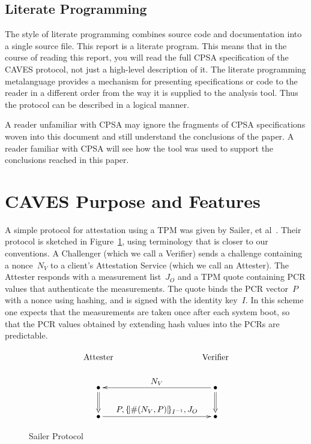 \documentclass[titlepage,12pt]{article}
\theoremstyle{definition}
\newcommand{\enc}[2]{\{\!|#1|\!\}_{#2}}
\begin{document}
\subsection{Literate Programming}

The style of literate programming combines source code and
documentation into a single source file.  This report is a literate
program. This means that in the course of reading this report, you
will read the full CPSA specification of the CAVES protocol, not just a
high-level description of it.  The literate programming metalanguage
provides a mechanism for presenting specifications or code to the
reader in a different order from the way it is supplied to the
analysis tool.  Thus the protocol can be described in a logical
manner.

A reader unfamiliar with CPSA may ignore the fragments of CPSA
specifications woven into this document and still understand the
conclusions of the paper.  A reader familiar with CPSA will see how
the tool was used to support the conclusions reached in this paper.

\section{CAVES Purpose and Features}

A simple protocol for attestation using a TPM was given by Sailer, et
al~\cite{Sailer04}.  Their protocol is sketched in
Figure~\ref{fig:sailer}, using terminology that is closer to our
conventions. A Challenger (which we call a Verifier) sends a challenge
containing a nonce~$N_V$ to a client's Attestation Service (which we
call an Attester). The Attester responds with a measurement list~$J_O$
and a TPM quote containing PCR values that authenticate the
measurements.  The quote binds the PCR vector~$P$ with a nonce using
hashing, and is signed with the identity key~$I$.  In this scheme one
expects that the measurements are taken once after each system boot,
so that the PCR values obtained by extending hash values into the PCRs
are predictable.

\begin{figure}
$$\xymatrix@C=10em{
\txt{\strut Attester}&\txt{\strut Verifier}\\
\bullet\ar@{=>}[d]&\bullet\ar@{=>}[d]\ar[l]_{\textstyle N_V}\\
\bullet\ar[r]^{\textstyle P,\enc{\#(N_V,P)}{I^{-1}},J_O}&\bullet}$$
\caption{Sailer Protocol}\label{fig:sailer}
\end{figure}
\end{document}
